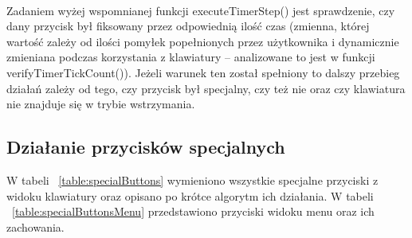 \documentclass[twoside,a4paper]{book}
\begin{document}
\\Zadaniem wyżej wspomnianej funkcji executeTimerStep() jest sprawdzenie, czy dany przycisk był fiksowany przez odpowiednią ilość czas (zmienna, której wartość zależy od ilości pomyłek popełnionych przez użytkownika i dynamicznie zmieniana podczas korzystania z klawiatury – analizowane to jest w funkcji verifyTimerTickCount()). Jeżeli warunek ten został spełniony to dalszy przebieg działań zależy od tego, czy przycisk był specjalny, czy też nie oraz czy klawiatura nie znajduje się w trybie wstrzymania. 
\subsection{Działanie przycisków specjalnych}
W tabeli ~\ref{table:specialButtons} wymieniono wszystkie specjalne przyciski z widoku klawiatury oraz opisano po krótce algorytm ich działania. W tabeli ~\ref{table:specialButtonsMenu} przedstawiono przyciski widoku menu oraz ich zachowania.
\end{document}
